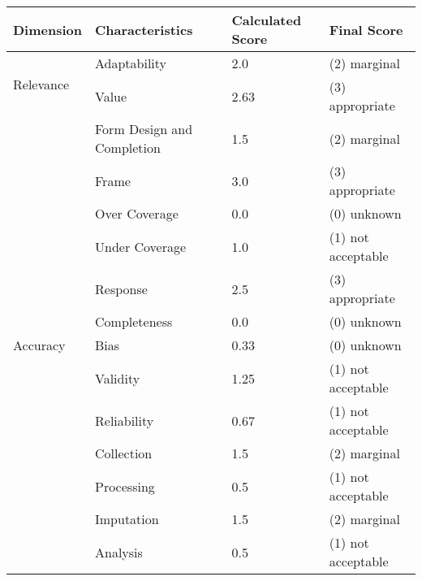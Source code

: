 \begin{table}[htbp]
    \begin{tabular}{llll}
        \toprule
        Dimension                           & Characteristics               & Calculated Score  & Final Score           \\ \midrule
        \multirow{2}{*}{Relevance}          & Adaptability                  & 2.0               & (2) marginal          \\
                                            & Value                         & 2.63              & (3) appropriate       \\ \midrule
        \multirow{13}{*}{Accuracy}          & Form Design and Completion    & 1.5               & (2) marginal          \\
                                            & Frame                         & 3.0               & (3) appropriate       \\
                                            & Over Coverage                 & 0.0               & (0) unknown           \\
                                            & Under Coverage                & 1.0               & (1) not acceptable    \\
                                            & Response                      & 2.5               & (3) appropriate       \\
                                            & Completeness                  & 0.0               & (0) unknown           \\
                                            & Bias                          & 0.33              & (0) unknown           \\
                                            & Validity                      & 1.25              & (1) not acceptable    \\
                                            & Reliability                   & 0.67              & (1) not acceptable    \\
                                            & Collection                    & 1.5               & (2) marginal          \\
                                            & Processing                    & 0.5               & (1) not acceptable    \\
                                            & Imputation                    & 1.5               & (2) marginal          \\
                                            & Analysis                      & 0.5               & (1) not acceptable    \\ \midrule

\end{tabular}
\end{table}
